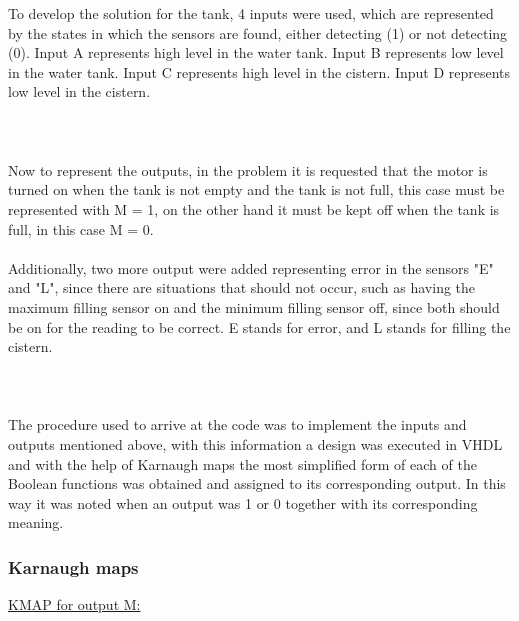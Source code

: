\documentclass{article}
\begin{document}
\begin{multicols}{2}
To develop the solution for the tank, 4 inputs were used, which are represented by the states in which the sensors are found, either detecting (1) or not detecting (0). Input A represents high level in the water tank. Input B represents low level in the water tank. Input C represents high level in the cistern. Input D represents low level in the cistern.
\\ \phantom\\ \\ \phantom \\ 
Now to represent the outputs, in the problem it is requested that the motor is turned on when the tank is not empty and the tank is not full, this case must be represented with M = 1, on the other hand it must be kept off when the tank is full, in this case M = 0.
\\ \phantom\\ 
Additionally, two more output were added representing error in the sensors "E" and "L", since there are situations that should not occur, such as having the maximum filling sensor on and the minimum filling sensor off, since both should be on for the reading to be correct. E stands for error, and L stands for filling the cistern.
\\ \phantom\\ \\ \phantom \\ 
The procedure used to arrive at the code was to implement the inputs and outputs mentioned above, with this information a design was executed in VHDL and with the help of Karnaugh maps the most simplified form of each of the Boolean functions was obtained and assigned to its corresponding output. In this way it was noted when an output was 1 or 0 together with its corresponding meaning. 
\subsubsection*{Karnaugh maps}

\underline{KMAP for output M:} \vspace{-4mm}


\end{multicols}
\end{document}
